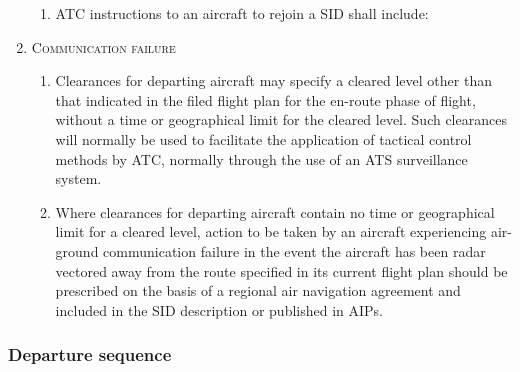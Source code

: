 \documentclass[../main.tex]{subfiles}
\begin{document}
\begin{enumerate}[itemsep=0.2cm]
\begin{enumerate}
            \item ATC instructions to an aircraft to rejoin a SID shall include:

            
            
        \end{enumerate}

        \item \textsc{Communication failure}

        \begin{enumerate}
            \item Clearances for departing aircraft may specify a cleared level other than that indicated in the filed flight plan for the en-route phase of flight, without a time or geographical limit for the cleared level. Such clearances will normally be used to facilitate the application of tactical control methods by ATC, normally through the use of an ATS surveillance system.
            \item Where clearances for departing aircraft contain no time or geographical limit for a cleared level, action to be taken by an aircraft experiencing air-ground communication failure in the event the aircraft has been radar vectored away from the route specified in its current flight plan should be prescribed on the basis of a regional air navigation agreement and included in the SID description or published in AIPs.
        \end{enumerate}
    \end{enumerate}

    \subsubsection{Departure sequence}
\end{document}
